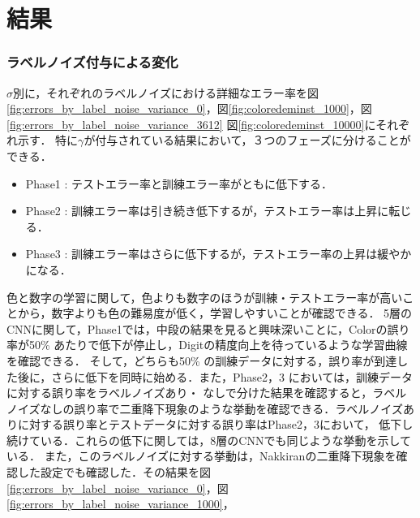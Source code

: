 \chapter{結果}
\label{chap:results}

\subsection{ラベルノイズ付与による変化}
$\sigma$別に，それぞれのラベルノイズにおける詳細なエラー率を図\ref{fig:errors_by_label_noise_variance_0}，図\ref{fig:coloredeminst_1000}，図\ref{fig:errors_by_label_noise_variance_3612}
図\ref{fig:coloredeminst_10000}にそれぞれ示す．
特に$\gamma$が付与されている結果において，３つのフェーズに分けることができる．
\begin{itemize}
    \item Phase1 : テストエラー率と訓練エラー率がともに低下する．
    \item Phase2 : 訓練エラー率は引き続き低下するが，テストエラー率は上昇に転じる．
    \item Phase3 : 訓練エラー率はさらに低下するが，テストエラー率の上昇は緩やかになる．
\end{itemize}
色と数字の学習に関して，色よりも数字のほうが訓練・テストエラー率が高いことから，数字よりも色の難易度が低く，学習しやすいことが確認できる．
5層のCNNに関して，Phase1では，中段の結果を見ると興味深いことに，Colorの誤り率が50\% あたりで低下が停止し，Digitの精度向上を待っているような学習曲線を確認できる．
そして，どちらも50\% の訓練データに対する，誤り率が到達した後に，さらに低下を同時に始める．また，Phase2，3 においては，訓練データに対する誤り率をラベルノイズあり・
なしで分けた結果を確認すると，ラベルノイズなしの誤り率で二重降下現象のような挙動を確認できる．ラベルノイズありに対する誤り率とテストデータに対する誤り率はPhase2，3において，
低下し続けている．これらの低下に関しては，8層のCNNでも同じような挙動を示している．
また，このラベルノイズに対する挙動は，Nakkiranの二重降下現象を確認した設定でも確認した．その結果を図\ref{fig:errors_by_label_noise_variance_0}，図\ref{fig:errors_by_label_noise_variance_1000}，
